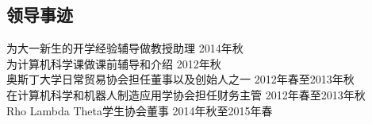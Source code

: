 \documentclass[margin]{res}
\begin{document}
\begin{resume}
\section{领导事迹}
为大一新生的开学经验辅导做教授助理 \hfill 2014年秋\\
为计算机科学课做课前辅导和介绍 \hfill 2012年秋\\
奥斯丁大学日常贸易协会担任董事以及创始人之一 \hfill 2012年春至2013年秋\\
在计算机科学和机器人制造应用学协会担任财务主管 \hfill 2012年春至2013年秋\\
Rho Lambda Theta学生协会董事 \hfill 2014年秋至2015年春

\end{resume}
\clearpage
\end{document}
